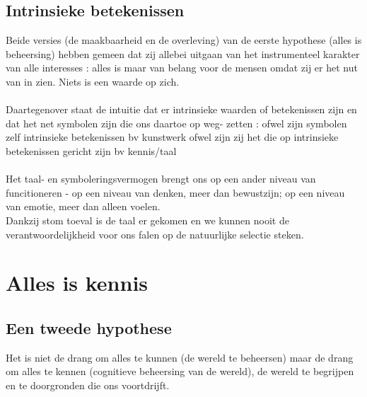 \documentclass[11pt,a4paper]{article}
\begin{document}
\subsection{Intrinsieke betekenissen}
Beide versies (de maakbaarheid en de overleving) van de eerste hypothese (alles is beheersing) hebben gemeen dat zij allebei uitgaan van het instrumenteel karakter van alle interesses : alles is maar van belang voor de mensen omdat zij er het nut van in zien. Niets is een waarde op zich.
\\
\\
Daartegenover staat de intuitie dat er intrinsieke waarden of betekenissen zijn en dat het net symbolen zijn die ons daartoe op weg- zetten : ofwel zijn symbolen zelf intrinsieke betekenissen bv kunstwerk ofwel zijn zij het die op intrinsieke betekenissen gericht zijn bv kennis/taal
\\
\\
Het taal- en symboleringsvermogen brengt ons op een ander niveau van funcitioneren - op een niveau van denken, meer dan bewustzijn; op een niveau van emotie, meer dan alleen voelen.
\\
Dankzij stom toeval is de taal er gekomen en we kunnen nooit de verantwoordelijkheid voor ons falen op de natuurlijke selectie steken.
\section{Alles is kennis}
\subsection{Een tweede hypothese}
Het is niet de drang om alles te kunnen (de wereld te beheersen) maar de drang om alles te kennen (cognitieve beheersing van de wereld), de wereld te begrijpen en te doorgronden die ons voortdrijft.
\end{document}
